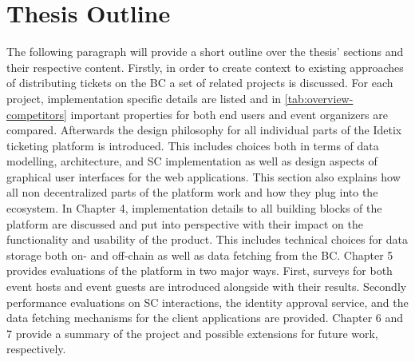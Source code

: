 \section{Thesis Outline}

The following paragraph will provide a short outline over the thesis' sections and their respective content. Firstly, in order to create context to existing approaches of distributing tickets on the BC a set of related projects is discussed. For each project, implementation specific details are listed and in \ref{tab:overview-competitors} important properties for both end users and event organizers are compared. Afterwards the design philosophy for all individual parts of the Idetix ticketing platform is introduced. This includes choices both in terms of data modelling, architecture, and SC implementation as well as design aspects of graphical user interfaces for the web applications. This section also explains how all non decentralized parts of the platform work and how they plug into the ecosystem. In Chapter 4, implementation details to all building blocks of the platform are discussed and put into perspective with their impact on the functionality and usability of the product. This includes technical choices for data storage both on- and off-chain as well as data fetching from the BC. Chapter 5 provides evaluations of the platform in two major ways. First, surveys for both event hosts and event guests are introduced alongside with their results. Secondly performance evaluations on SC interactions, the identity approval service, and the data fetching mechanisms for the client applications are provided. Chapter 6 and 7 provide a summary of the project and possible extensions for future work, respectively.